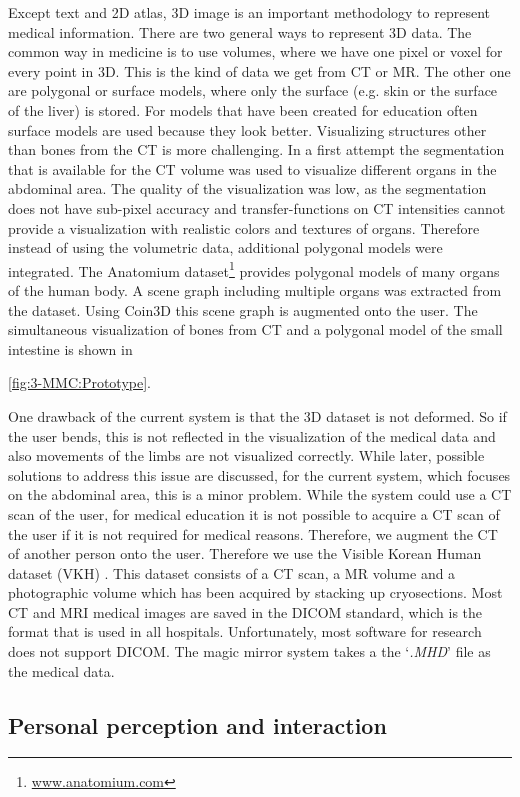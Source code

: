 {Except text and 2D atlas, 3D image is an important methodology to represent medical information. There are two general ways to represent 3D data. The common way in medicine is to use volumes, where we have one pixel or voxel for every point in 3D. This is the kind of data we get from CT or MR. The other one are polygonal or surface models, where only the surface (e.g. skin or the surface of the liver) is stored. For models that have been created for education often surface models are used because they look better.
Visualizing structures other than bones from the CT is more challenging. In a first attempt the segmentation that is available for the CT volume was used to visualize different organs in the abdominal area. The quality of the visualization was low, as the segmentation does not have sub-pixel accuracy and transfer-functions on CT intensities cannot provide a visualization with realistic colors and textures of organs. Therefore instead of using the volumetric data, additional polygonal models were integrated. The Anatomium dataset\footnote{\url{www.anatomium.com}} provides polygonal models of many organs of the human body. A scene graph including multiple organs was extracted from the dataset. Using Coin3D this scene graph is augmented onto the user. The simultaneous visualization of bones from CT and a polygonal model of the small intestine is shown in \figurename{\ref{fig:3-MMC:Prototype}.

One drawback of the current system is that the 3D dataset is not deformed. So if the user bends, this is not reflected in the visualization of the medical data and also movements of the limbs are not visualized correctly. While later, possible solutions to address this issue are discussed, for the current system, which focuses on the abdominal area, this is a minor problem.	
While the system could use a CT scan of the user, for medical education it is not possible to acquire a CT scan of the user if it is not required for medical reasons. Therefore, we augment the CT of another person onto the user. Therefore we use the Visible Korean Human dataset (VKH) \cite{Park2006}. This dataset consists of a CT scan, a MR volume and a photographic volume which has been acquired by stacking up cryosections. 
Most CT and MRI medical images are saved in the DICOM standard, which is the format that is used in all hospitals. Unfortunately, most software for research does not support DICOM. The magic mirror system takes a the `\textit{\*.MHD}' file as the medical data.
\subsection{Personal perception and interaction}
}}
